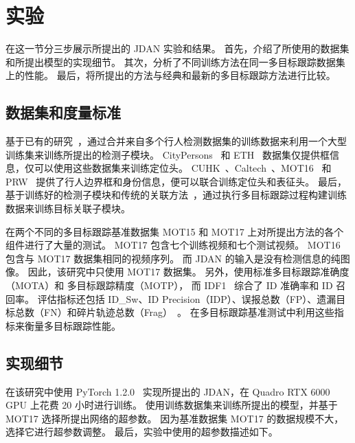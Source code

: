  
\section{实验}
在这一节分三步展示所提出的 JDAN 实验和结果。
首先，介绍了所使用的数据集和所提出模型的实现细节。
其次，分析了不同训练方法在同一多目标跟踪数据集上的性能。
最后，将所提出的方法与经典和最新的多目标跟踪方法进行比较。

\subsection{数据集和度量标准}
基于已有的研究~\cite{jde,fairmot}，通过合并来自多个行人检测数据集的训练数据来利用一个大型训练集来训练所提出的检测子模块。
CityPersons~\cite{zhang2017citypersons} 和 ETH~\cite{ess2008mobile} 数据集仅提供框信息，仅可以使用这些数据集来训练定位头。
CUHK~\cite{xiao2017joint}、Caltech~\cite{dollar2009pedestrian}、MOT16~\cite{mot16} 和 PRW~\cite{zheng2017person} 提供了行人边界框和身份信息，便可以联合训练定位头和表征头。
最后，基于训练好的检测子模块和传统的关联方法~\cite{kernelized,fairmot}，通过执行多目标跟踪过程构建训练数据来训练目标关联子模块。

在两个不同的多目标跟踪基准数据集 MOT15 和 MOT17 上对所提出方法的各个组件进行了大量的测试。
MOT17 包含七个训练视频和七个测试视频。
MOT16 包含与 MOT17 数据集相同的视频序列。
而 JDAN 的输入是没有检测信息的纯图像。
因此，该研究中只使用 MOT17 数据集。
另外，使用标准多目标跟踪准确度（MOTA）和 多目标跟踪精度（MOTP），
而 IDF1~\cite{ristani2016performance} 综合了 ID 准确率和 ID 召回率。
评估指标还包括 ID\_Sw、ID Precision（IDP）、误报总数（FP）、遗漏目标总数（FN）和碎片轨迹总数（Frag）~\cite{clear}。
在多目标跟踪基准测试中利用这些指标来衡量多目标跟踪性能。

\subsection{实现细节}
\label{sec:implementation_details}
在该研究中使用 PyTorch 1.2.0~\cite{pytorch} 实现所提出的 JDAN，在 Quadro RTX 6000 GPU 上花费 20 小时进行训练。
使用训练数据集来训练所提出的模型，并基于 MOT17 选择所提出网络的超参数。
因为基准数据集 MOT17 的数据规模不大，选择它进行超参数调整。
最后，实验中使用的超参数描述如下。

